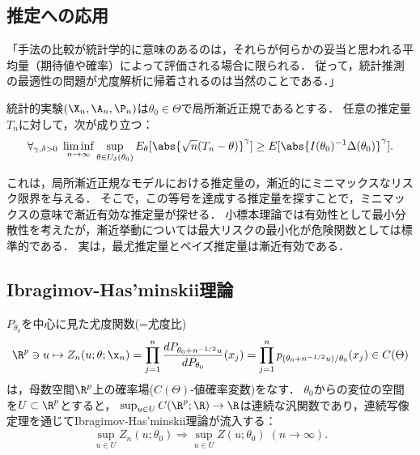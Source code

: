 \documentclass[uplatex,dvipdfmx]{jsreport}
\begin{document}
\subsection{推定への応用}

\begin{tcolorbox}[colframe=ForestGreen, colback=ForestGreen!10!white,breakable,colbacktitle=ForestGreen!40!white,coltitle=black,fonttitle=\bfseries\sffamily,
title=]
    「手法の比較が統計学的に意味のあるのは，それらが何らかの妥当と思われる平均量（期待値や確率）によって評価される場合に限られる．
    従って，統計推測の最適性の問題が尤度解析に帰着されるのは当然のことである．」
\end{tcolorbox}

\begin{theorem}[Hajekの不等式]
    統計的実験$(\X_n,\A_n,\P_n)$は$\theta_0\in\Theta$で局所漸近正規であるとする．
    任意の推定量$T_n$に対して，次が成り立つ：
    \[\forall_{\gamma,\delta>0}\;\liminf_{n\to\infty}\sup_{\theta\in U_\delta(\theta_0)}E_\theta[\abs{\sqrt{n}(T_n-\theta)}^\gamma]\ge E[\abs{I(\theta_0)^{-1}\Delta(\theta_0)}^\gamma].\]
\end{theorem}
\begin{remarks}[漸近決定理論]
    これは，局所漸近正規なモデルにおける推定量の，漸近的にミニマックスなリスク限界を与える．
    そこで，この等号を達成する推定量を探すことで，ミニマックスの意味で漸近有効な推定量が探せる．
    小標本理論では有効性として最小分散性を考えたが，漸近挙動については最大リスクの最小化が危険関数としては標準的である．
    実は，最尤推定量とベイズ推定量は漸近有効である．
\end{remarks}

\subsection{Ibragimov-Has'minskii理論}

\begin{tcolorbox}[colframe=ForestGreen, colback=ForestGreen!10!white,breakable,colbacktitle=ForestGreen!40!white,coltitle=black,fonttitle=\bfseries\sffamily,
title=]
    $P_{\theta_0}$を中心に見た尤度関数(=尤度比)
    \[\R^p\ni u\mapsto Z_n(u;\theta;\x_n)=\prod^n_{j=1}\frac{dP_{\theta_0+n^{-1/2}u}}{dP_{\theta_0}}(x_j)=\prod^n_{j=1}p_{(\theta_0+n^{-1/2}u)/\theta_0}(x_j)\in C(\Theta)\]
    は，母数空間$\R^p$上の確率場($C(\Theta)$-値確率変数)をなす．
    $\theta_0$からの変位の空間を$U\subset\R^p$とすると，
    $\sup_{u\in U}C(\R^p;\R)\to\R$は連続な汎関数であり，連続写像定理を通じてIbragimov-Has'minskii理論が流入する：
    \[\sup_{u\in U}Z_n(u;\theta_0)\Rightarrow\sup_{u\in U}Z(u;\theta_0)\;(n\to\infty).\]
\end{tcolorbox}
\end{document}

